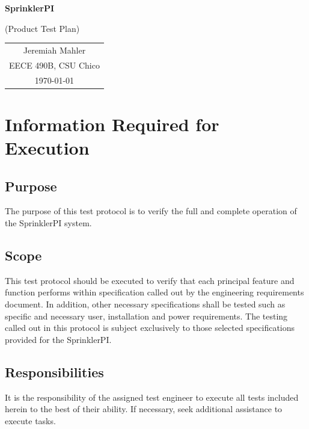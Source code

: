 \documentclass{article}
\begin{document}
\vspace*{1.0in}

\centerline{\Large \textbf{SprinklerPI}}
\centerline{(Product Test Plan)}

\vspace{0.5in}

\begin{center}
\begin{tabular}{c}
Jeremiah Mahler \\
EECE 490B, CSU Chico \\
\today
\end{tabular}
\end{center}

\thispagestyle{empty}

\vfill

\pagebreak

\thispagestyle{empty}
\tableofcontents
\clearpage

\section{Information Required for Execution}

\subsection{Purpose}

The purpose of this test protocol is to verify the full and complete
operation of the SprinklerPI system.

\subsection{Scope}

This test protocol should be executed to verify that each principal feature
and function performs within specification called out by the engineering
requirements document. In addition, other necessary specifications shall
be tested such as specific and necessary user, installation and power
requirements. The testing called out in this protocol is subject exclusively
to those selected specifications provided for the SprinklerPI.

\subsection{Responsibilities}

It is the responsibility of the assigned test engineer to execute all tests
included herein to the best of their ability. If necessary, seek additional
assistance to execute tasks.
\end{document}
